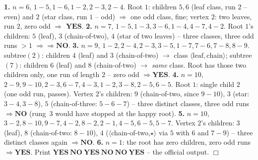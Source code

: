 \begin{tracebox}
\textbf{1.} \(n{=}6\), \(1\!-\!5,1\!-\!6,1\!-\!2,2\!-\!3,2\!-\!4\).  Root \(1\):
children \(5,6\) (leaf class, run \(2\) -- even) and \(2\) (star class, run \(1\)
-- odd) \(\Rightarrow\) one odd class, fine; vertex \(2\): two leaves, run \(2\),
zero odd \(\Rightarrow\) \(\mathbf{YES}\).
\textbf{2.} \(n{=}7\), \(1\!-\!5,1\!-\!3,3\!-\!6,1\!-\!4,4\!-\!7,4\!-\!2\).  Root
\(1\)'s children: \(5\) (leaf), \(3\) (chain-of-two), \(4\) (star of two leaves)
-- three classes, three odd runs \(>1\) \(\Rightarrow\Rightarrow\mathbf{NO}\).
\textbf{3.} \(n{=}9\), \(1\!-\!2,2\!-\!4,2\!-\!3,3\!-\!5,1\!-\!7,7\!-\!6,7\!-\!8,8\!-\!9\).
subtree\((2)\): children \(4\) (leaf) and \(3\) (chain-of-two) \(\to\) class
\(\langle\text{leaf},\text{chain}\rangle\); subtree\((7)\): children \(6\) (leaf)
and \(8\) (chain-of-two) \(\to\) \emph{same} class.  Root has those two children
only, one run of length \(2\) -- zero odd \(\Rightarrow\mathbf{YES}\).
\textbf{4.} \(n{=}10\), \(2\!-\!9,9\!-\!10,2\!-\!3,6\!-\!7,4\!-\!3,1\!-\!2,3\!-\!8,2\!-\!5,6\!-\!5\).
Root \(1\): single child \(2\) (one odd run, passes).  Vertex \(2\)'s children:
\(9\) (chain-of-two, since \(9\!-\!10\)), \(3\) (star: \(3\!-\!4,3\!-\!8\)), \(5\)
(chain-of-three: \(5\!-\!6\!-\!7\)) -- three distinct classes, three odd runs
\(\Rightarrow\mathbf{NO}\) (rung~3 would have stopped at the happy root).
\textbf{5.} \(n{=}10\), \(3\!-\!2,8\!-\!10,9\!-\!7,4\!-\!2,8\!-\!2,2\!-\!1,4\!-\!5,6\!-\!5,5\!-\!7\).
Vertex \(2\)'s children: \(3\) (leaf), \(8\) (chain-of-two: \(8\!-\!10\)), \(4\)
(\(\langle\)chain-of-two,\(\star\rangle\) via \(5\) with \(6\) and \(7\!-\!9\)) --
three distinct classes again \(\Rightarrow\mathbf{NO}\).
\textbf{6.} \(n{=}1\): the root has zero children, zero odd runs
\(\Rightarrow\mathbf{YES}\).  Print \(\mathbf{YES\ NO\ YES\ NO\ NO\ YES}\) -- the
official output. \(\Box\)
\end{tracebox}

